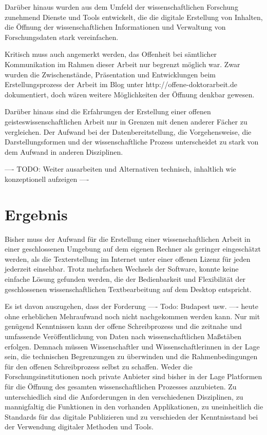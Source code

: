 Darüber hinaus wurden aus dem Umfeld der wissenschaftlichen Forschung zunehmend Dienste und Tools entwickelt, die die digitale Erstellung von Inhalten, die Öffnung der wissenschaftlichen Informationen und Verwaltung von Forschungsdaten stark vereinfachen.

Kritisch muss auch angemerkt werden, das Offenheit bei sämtlicher Kommunikation im Rahmen dieser Arbeit nur begrenzt möglich war. Zwar wurden die Zwischenstände, Präsentation und Entwicklungen beim Erstellungsprozess der Arbeit im Blog unter http://offene-doktorarbeit.de dokumentiert, doch wären weitere Möglichkeiten der Öffnung denkbar gewesen.

Darüber hinaus sind die Erfahrungen der Erstellung einer offenen geisteswissenschaftlichen Arbeit nur in Grenzen mit denen anderer Fächer zu vergleichen. Der Aufwand bei der Datenbereitstellung, die Vorgehensweise, die Darstellungsformen und der wissenschaftliche Prozess unterscheidet zu stark von dem Aufwand in anderen Disziplinen.

---- TODO: Weiter ausarbeiten und Alternativen technisch, inhaltlich wie konzeptionell aufzeigen ----

\section{Ergebnis}

Bisher muss der Aufwand für die Erstellung einer wissenschaftlichen Arbeit in einer geschlossenen Umgebung auf dem eigenen Rechner als geringer eingeschätzt werden, als die Texterstellung im Internet unter einer offenen Lizenz für jeden jederzeit einsehbar. Trotz mehrfachen Wechsels der Software, konnte keine einfache Lösung gefunden werden, die der Bedienbarkeit und Flexibilität der geschlossenen wissenschaftlichen Textbearbeitung auf dem Desktop entspricht.

Es ist davon auszugehen, dass der Forderung ---- Todo: Budapest usw. ---- heute ohne erheblichen Mehraufwand noch nicht nachgekommen werden kann. Nur mit genügend Kenntnissen kann der offene Schreibprozess und die zeitnahe und umfassende Veröffentlichung von Daten nach wissenschaftlichen Maßstäben erfolgen. Demnach müssen Wissenschaftler und Wissenschaftlerinnen in der Lage sein, die technischen Begrenzungen zu überwinden und die Rahmenbedingungen für den offenen Schreibprozess selbst zu schaffen. Weder die Forschungsinstitutionen noch private Anbieter sind bisher in der Lage Platformen für die Öffnung des gesamten wissenschaftlichen Prozesses anzubieten. Zu unterschiedlich sind die Anforderungen in den verschiedenen Disziplinen, zu mannigfaltig die Funktionen in den vorhanden Applikationen, zu uneinheitlich die Standards für das digitale Publizieren und zu verschieden der Kenntnisstand bei der Verwendung digitaler Methoden und Tools.

